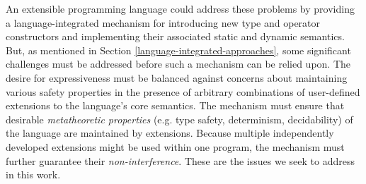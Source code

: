 %
%



An extensible programming language could address these problems by providing a language-integrated mechanism for introducing new type and operator constructors and implementing their associated static and dynamic semantics. 
But, as mentioned in Section \ref{language-integrated-approaches}, some significant challenges must be addressed before such a mechanism can be relied upon. The desire for expressiveness must be balanced against  concerns about maintaining various safety properties in the presence of arbitrary combinations of user-defined  extensions to the language's core semantics. The mechanism must ensure that desirable \emph{metatheoretic properties} (e.g. type safety, determinism, decidability) of the language are maintained by extensions. Because multiple independently developed extensions might be used within one program, the mechanism must further guarantee their \emph{non-interference}. These are the issues we seek to address in this work.
